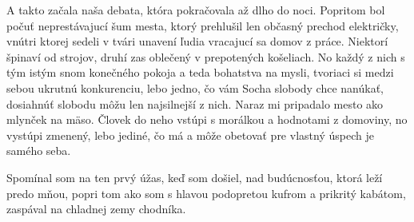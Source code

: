 \documentclass[12pt, a4paper]{article}
\begin{document}
A takto začala naša debata, która pokračovala až dlho do noci.
Popritom bol počuť neprestávajucí šum mesta, ktorý prehlušil len občasný prechod električky, vnútri ktorej sedeli v tvári unavení ľudia vracajucí sa domov z práce. Niektorí špinaví od strojov, druhí zas oblečený v prepotených košeliach.
No každý z nich s tým istým snom konečného pokoja a teda bohatstva na mysli, tvoriaci si medzi sebou ukrutnú konkurenciu, lebo jedno, čo vám Socha slobody chce nanúkať, dosiahnúť slobodu môžu len najsilnejší z nich. Naraz mi pripadalo mesto ako mlynček na mäso.
Človek do neho vstúpi s morálkou a hodnotami z domoviny, no vystúpi zmenený, lebo jediné, čo má a môže obetovať pre vlastný úspech je samého seba.

Spomínal som na ten prvý úžas, keď som došiel, nad budúcnosťou, ktorá leží predo mňou, popri tom ako som s hlavou podopretou kufrom a prikritý kabátom, zaspával na chladnej zemy chodníka.
\end{document}
